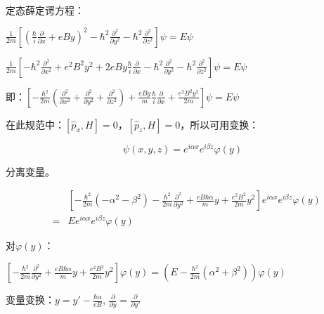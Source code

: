 定态薛定谔方程：

\begin{center}
$\frac{1}{{2m}}\left[ {\left( {\frac{\hbar }{i}\frac{\partial }{{\partial x}} + eBy} \right)^2  - \hbar ^2 \frac{{\partial ^2 }}{{\partial y^2 }} - \hbar ^2 \frac{{\partial ^2 }}{{\partial z^2 }}} \right]\psi  = E\psi $

$\frac{1}{{2m}}\left[ { - \hbar ^2 \frac{{\partial ^2 }}{{\partial x^2 }} + e^2 B^2 y^2  + 2eBy\frac{\hbar }{i}\frac{\partial }{{\partial x}} - \hbar ^2 \frac{{\partial ^2 }}{{\partial y^2 }} - \hbar ^2 \frac{{\partial ^2 }}{{\partial z^2 }}} \right]\psi  = E\psi $

\end{center}

即：$\left[ { - \frac{{\hbar ^2 }}{{2m}}\left( {\frac{{\partial ^2 }}{{\partial x^2 }} + \frac{{\partial ^2 }}{{\partial y^2 }} + \frac{{\partial ^2 }}{{\partial z^2 }}} \right) + \frac{{eBy}}{m}\frac{\hbar }{i}\frac{\partial }{{\partial x}} + \frac{{e^2 B^2 y^2 }}{{2m}}} \right]\psi  = E\psi $

在此规范中：$\left[ {\widehat p_x ,H} \right] = 0$，$\left[ {\widehat p_z ,H} \right] = 0$，所以可用变换：

\begin{equation}
\psi \left( {x,y,z} \right) = e^{i\alpha x} e^{i\beta z} \varphi \left( y \right)
\end{equation}

分离变量。

\begin{eqnarray*}
{} &{}& \left[ { - \frac{{\hbar ^2 }}{{2m}}\left( { - \alpha ^2  - \beta ^2 } \right) - \frac{{\hbar ^2 }}{{2m}}\frac{{\partial ^2 }}{{\partial y^2 }} + \frac{{eB\hbar \alpha }}{m}y + \frac{{e^2 B^2 }}{{2m}}y^2 } \right]e^{i\alpha x} e^{i\beta z} \varphi \left( y \right) \\
{} & = & Ee^{i\alpha x} e^{i\beta z} \varphi \left( y \right)
\end{eqnarray*}

对$\varphi \left( y \right)$：

$\left[ { - \frac{{\hbar ^2 }}{{2m}}\frac{{\partial ^2 }}{{\partial y^2 }} + \frac{{eB\hbar \alpha }}{m}y + \frac{{e^2 B^2 }}{{2m}}y^2 } \right]\varphi \left( y \right) = \left( {E - \frac{{\hbar ^2 }}{{2m}}\left( {\alpha ^2  + \beta ^2 } \right)} \right)\varphi \left( y \right)$

变量变换：$y = y' - \frac{{\hbar \alpha }}{{eB}}$, $\frac{\partial }{{\partial y}} = \frac{\partial }{{\partial y'}}$

